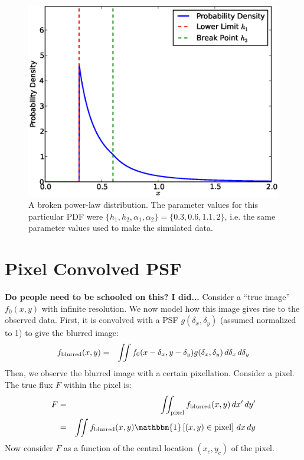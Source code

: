 \documentclass[manuscript]{aastex}
\begin{document}
\begin{figure}[h!]
\begin{center}
\includegraphics[scale=0.5]{Figures/broken.eps}
\caption{A broken power-law distribution. The parameter values for this
particular PDF were
$\{h_1, h_2, \alpha_1, \alpha_2\} = \{0.3, 0.6, 1.1, 2\}$, i.e. the same
parameter values used to make the simulated data.
\label{fig:powerlaw}}
\end{center}
\end{figure}


\section{Pixel Convolved PSF}
{\bf Do people need to be schooled on this? I did...}
Consider a ``true image'' $f_0(x, y)$ with infinite resolution. We now model how
this image gives rise to the observed data. First, it is convolved with a
PSF $g(\delta_x, \delta_y)$ (assumed normalized to 1) to give the blurred image:
\begin{eqnarray}
f_{\rm{blurred}}(x, y) &=& \iint f_0(x-\delta_x, y-\delta_y)
g(\delta_x, \delta_y) \, d\delta_x \, d\delta_y \label{blur}
\end{eqnarray}
Then, we observe the blurred image with a certain pixellation. Consider a pixel.
The true flux $F$ within the pixel is:
\begin{eqnarray}
F &=& \iint_{\rm pixel} f_{\rm blurred}(x, y) \,dx'\,dy'\\
&=& \iint f_{\rm blurred}(x, y)\mathbbm{1}\left[(x,y) \in \textnormal{pixel}
\right] \,dx\,dy \label{pixel}
\end{eqnarray}
Now consider $F$ as a function of the central location $(x_c, y_c)$ of the
pixel.
\end{document}
